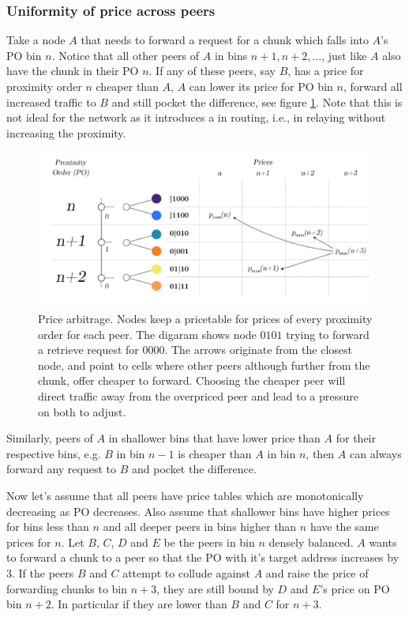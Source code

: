 \subsubsection{Uniformity of price across peers}

Take a node $A$ that needs to forward a request for a chunk which falls into $A$'s PO bin $n$. Notice that all other peers of $A$ in bins $n+1, n+2, ...$, just like $A$ also have the chunk in their PO $n$. If any of these peers, say $B$, has a price  for proximity order $n$ cheaper than $A$, $A$ can lower its price for PO bin $n$, forward all increased traffic to $B$ and still pocket the difference, see figure  \ref{fig:price-arbitrage}. Note that this is not ideal for the network as it introduces a  in routing, i.e., in relaying without increasing the proximity. 


\begin{figure}[htbp]
   \centering
   \includegraphics[width=\textwidth]{fig/price-arbitrage-3.pdf}
    \caption[Price arbitrage \statusgreen]{Price arbitrage. Nodes keep a pricetable for prices of every proximity order for each peer. The digaram shows node $0101$ trying to forward a retrieve request for $0000$. The arrows originate from the closest node, and point to cells where other peers although further from the chunk, offer cheaper to forward. Choosing the cheaper peer will direct traffic away from the overpriced peer and lead to a pressure on both to adjust.}
   \label{fig:price-arbitrage}
\end{figure}
 


Similarly, peers of $A$ in shallower bins that have lower price than $A$ for their respective bins, e.g. $B$ in bin $n-1$ is cheaper than $A$ in bin $n$, then $A$ can always forward any request to $B$ and pocket the difference.

Now let's assume that all peers have price tables which are monotonically decreasing as PO decreases. Also assume that shallower bins have higher prices for bins less than $n$ and all deeper peers in bins higher than $n$ have the same prices for $n$. Let $B$, $C$, $D$ and $E$ be the peers in bin $n$ densely balanced. $A$ wants to  forward a chunk to a peer so that the PO with it's target address increases by 3. If the peers $B$ and $C$ attempt to collude against $A$ and raise the price of forwarding chunks to bin $n+3$, they are still bound by $D$ and $E$'s price on PO bin $n+2$. In particular if they are lower than $B$ and $C$ for $n+3$.

